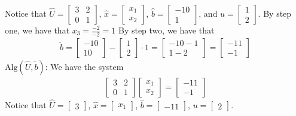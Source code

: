 \documentclass{report}
\begin{document}
    Notice that $\hat{U} = \begin{bmatrix} 3 & 2 \\ 0 & 1 \end{bmatrix} $, $\hat{x} = \begin{bmatrix} x_{1} \\ x_{2} \end{bmatrix} $, $\hat{b} = \begin{bmatrix} -10 \\ 1 \end{bmatrix} $, and $u = \begin{bmatrix} 1 \\ 2 \end{bmatrix} $.
    \bigbreak \noindent 
    By step one, we have that $x_{3} = \frac{-2}{-2} = 1$
    \bigbreak \noindent 
    By step two, we have that
    \begin{align*}
        \tilde{b} = \begin{bmatrix}
            -10 \\10
        \end{bmatrix}
        - \begin{bmatrix}
            1 \\ 2
        \end{bmatrix} \cdot 1 
        = 
        \begin{bmatrix}
            -10 - 1 \\
            1 -2
        \end{bmatrix}
         = 
         \begin{bmatrix}
             -11 \\
             -1
         \end{bmatrix}
    \end{align*}
    $\text{Alg}(\hat{U}, \tilde{b})$: We have the system
    \begin{align*}
       \begin{bmatrix}
           3 & 2 \\ 0 & 1
       \end{bmatrix} 
       \begin{bmatrix}
           x_{1} \\ x_{2}
       \end{bmatrix}
       = 
       \begin{bmatrix}
           -11 \\ -1
       \end{bmatrix}
    \end{align*}
    Notice that $\hat{U} = \begin{bmatrix} 3 \end{bmatrix}$, $\hat{x} = \begin{bmatrix} x_{1} \end{bmatrix} $, $\hat{b} = \begin{bmatrix} -11 \end{bmatrix} $, $u = \begin{bmatrix} 2 \end{bmatrix} $.
\end{document}

